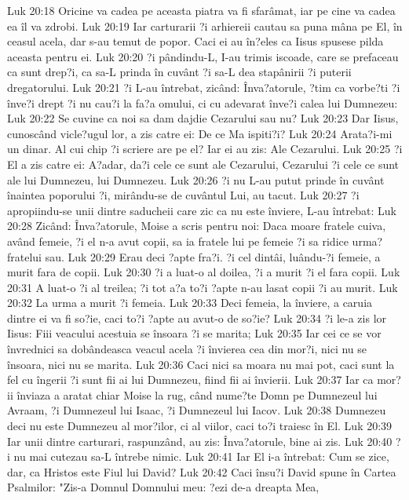 Luk 20:18  Oricine va cadea pe aceasta piatra va fi sfarâmat, iar pe cine va cadea ea îl va zdrobi.
Luk 20:19  Iar carturarii ?i arhiereii cautau sa puna mâna pe El, în ceasul acela, dar s-au temut de popor. Caci ei au în?eles ca Iisus spusese pilda aceasta pentru ei.
Luk 20:20  ?i pândindu-L, I-au trimis iscoade, care se prefaceau ca sunt drep?i, ca sa-L prinda în cuvânt ?i sa-L dea stapânirii ?i puterii dregatorului.
Luk 20:21  ?i L-au întrebat, zicând: Înva?atorule, ?tim ca vorbe?ti ?i înve?i drept ?i nu cau?i la fa?a omului, ci cu adevarat înve?i calea lui Dumnezeu:
Luk 20:22  Se cuvine ca noi sa dam dajdie Cezarului sau nu?
Luk 20:23  Dar Iisus, cunoscând vicle?ugul lor, a zis catre ei: De ce Ma ispiti?i?
Luk 20:24  Arata?i-mi un dinar. Al cui chip ?i scriere are pe el? Iar ei au zis: Ale Cezarului.
Luk 20:25  ?i El a zis catre ei: A?adar, da?i cele ce sunt ale Cezarului, Cezarului ?i cele ce sunt ale lui Dumnezeu, lui Dumnezeu.
Luk 20:26  ?i nu L-au putut prinde în cuvânt înaintea poporului ?i, mirându-se de cuvântul Lui, au tacut.
Luk 20:27  ?i apropiindu-se unii dintre saducheii care zic ca nu este înviere, L-au întrebat:
Luk 20:28  Zicând: Înva?atorule, Moise a scris pentru noi: Daca moare fratele cuiva, având femeie, ?i el n-a avut copii, sa ia fratele lui pe femeie ?i sa ridice urma? fratelui sau.
Luk 20:29  Erau deci ?apte fra?i. ?i cel dintâi, luându-?i femeie, a murit fara de copii.
Luk 20:30  ?i a luat-o al doilea, ?i a murit ?i el fara copii.
Luk 20:31  A luat-o ?i al treilea; ?i tot a?a to?i ?apte n-au lasat copii ?i au murit.
Luk 20:32  La urma a murit ?i femeia.
Luk 20:33  Deci femeia, la înviere, a caruia dintre ei va fi so?ie, caci to?i ?apte au avut-o de so?ie?
Luk 20:34  ?i le-a zis lor Iisus: Fiii veacului acestuia se însoara ?i se marita;
Luk 20:35  Iar cei ce se vor învrednici sa dobândeasca veacul acela ?i învierea cea din mor?i, nici nu se însoara, nici nu se marita.
Luk 20:36  Caci nici sa moara nu mai pot, caci sunt la fel cu îngerii ?i sunt fii ai lui Dumnezeu, fiind fii ai învierii.
Luk 20:37  Iar ca mor?ii înviaza a aratat chiar Moise la rug, când nume?te Domn pe Dumnezeul lui Avraam, ?i Dumnezeul lui Isaac, ?i Dumnezeul lui Iacov.
Luk 20:38  Dumnezeu deci nu este Dumnezeu al mor?ilor, ci al viilor, caci to?i traiesc în El.
Luk 20:39  Iar unii dintre carturari, raspunzând, au zis: Înva?atorule, bine ai zis.
Luk 20:40  ?i nu mai cutezau sa-L întrebe nimic.
Luk 20:41  Iar El i-a întrebat: Cum se zice, dar, ca Hristos este Fiul lui David?
Luk 20:42  Caci însu?i David spune în Cartea Psalmilor: "Zis-a Domnul Domnului meu: ?ezi de-a dreapta Mea,
